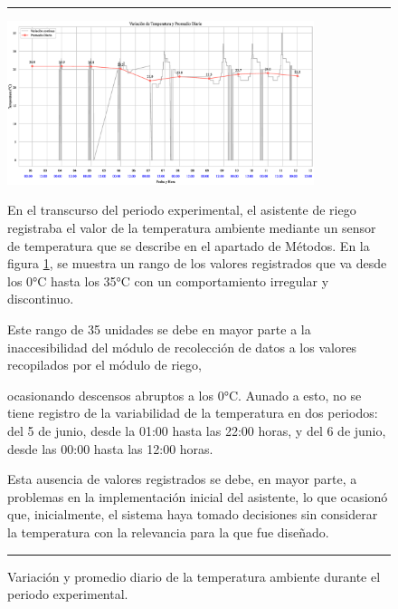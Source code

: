 \documentclass[pdflatex,sn-mathphys-num]{sn-jnl}%
\theoremstyle{thmstyleone}%
\theoremstyle{thmstyletwo}%
\theoremstyle{thmstylethree}%
\begin{document}
\begin{figure}[!ht]
    \hrule
    \vspace{0.2cm}
    \centering
    \includegraphics[width=0.8\textwidth]{assets/temperatura_continua_y_promedio.eps}
    \caption{Variación y promedio diario de la temperatura ambiente durante el periodo experimental.}
    \label{fig:temperatura_promedio}

    \vspace{0.4cm}

    \noindent
    \begin{minipage}[t]{0.49\textwidth}
        \justifying
         En el transcurso del periodo experimental, el asistente de riego registraba el valor de la temperatura ambiente mediante un sensor de temperatura que se describe en el apartado de Métodos. En la figura \ref{fig:temperatura_promedio}, se muestra un rango de los valores registrados que va desde los 0°C hasta los 35°C con un comportamiento irregular y discontinuo.

        Este rango de 35 unidades se debe en mayor parte a la inaccesibilidad del módulo de recolección de datos a los valores recopilados por el módulo de riego,

    \end{minipage}%
    \hfill
    \begin{minipage}[t]{0.49\textwidth}
        \justifying
        \noindent ocasionando descensos abruptos a los 0°C. Aunado a esto, no se tiene registro de la variabilidad de la temperatura en dos periodos: del 5 de junio, desde la 01:00 hasta las 22:00 horas, y del 6 de junio, desde las 00:00 hasta las 12:00 horas.

        Esta ausencia de valores registrados se debe, en mayor parte, a problemas en la implementación inicial del asistente, lo que ocasionó que, inicialmente, el sistema haya tomado decisiones sin considerar la temperatura con la relevancia para la que fue diseñado.   
	\end{minipage}

    \vspace{0.5cm}
    \hrule
\end{figure}
\end{document}

